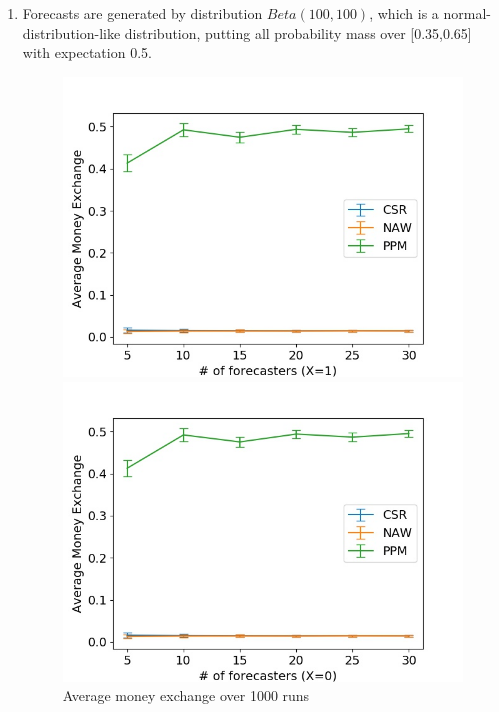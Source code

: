 \documentclass[english,10pt]{article}
\begin{document}
\begin{enumerate}
	\newpage
	\item Forecasts are generated by distribution $Beta(100, 100)$, which is a normal-distribution-like distribution, putting all probability mass over [0.35,0.65] with expectation 0.5.
		\begin{figure}[H]
        	\centering
        	\begin{minipage}{0.48\textwidth}
        \includegraphics[width = \textwidth]{MnEx(Beta(100_100)F_UnifW)Avg_MnEx(X=1).jpg}
        	\end{minipage}
        	\begin{minipage}{0.48\textwidth}
        \includegraphics[width = \textwidth]{MnEx(Beta(100_100)F_UnifW)Avg_MnEx(X=0).jpg}
        	\end{minipage}
        	\caption{Average money exchange over 1000 runs}
        	\end{figure}
        	

\end{enumerate}
\end{document}
